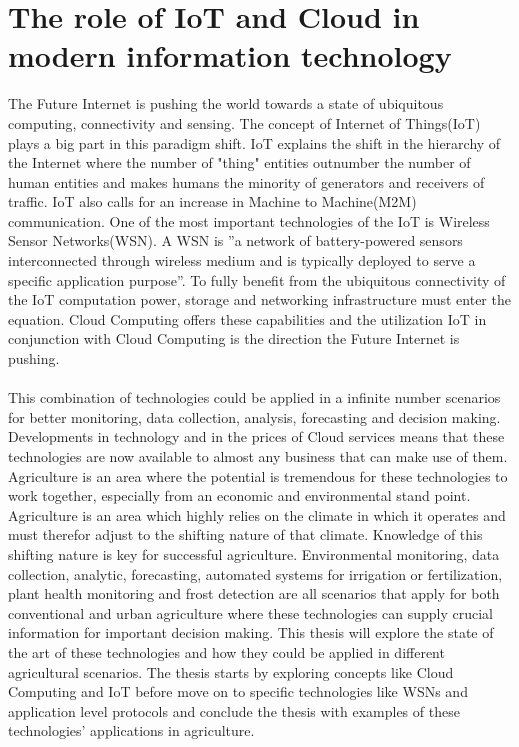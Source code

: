 \documentclass[]{uiophd}
\begin{document}
\section{The role of IoT and Cloud in modern information technology}
The Future Internet is pushing the world towards a state of ubiquitous computing, connectivity and sensing. The concept of Internet of Things(IoT) plays a big part in this paradigm shift. IoT explains the shift in the hierarchy of the Internet where the number of "thing" entities outnumber the number of human entities and makes humans the minority of generators and receivers of traffic. IoT also calls for an increase in Machine to Machine(M2M) communication. One of the most important technologies of the IoT is Wireless Sensor Networks(WSN). A WSN is ''a network of battery-powered sensors interconnected through wireless medium and is typically deployed to serve a specific application purpose''\cite{Ojha2015662}. To fully benefit from the ubiquitous connectivity of the IoT computation power, storage and networking infrastructure must enter the equation. Cloud Computing offers these capabilities and the utilization IoT in conjunction with Cloud Computing is the direction the Future Internet is pushing. 
\\\\
This combination of technologies could be applied in a infinite number scenarios for better monitoring, data collection, analysis, forecasting and decision making. Developments in technology and in the prices of Cloud services means that these technologies are now available to almost any business that can make use of them. Agriculture is an area where the potential is tremendous for these technologies to work together, especially from an economic and environmental stand point. Agriculture is an area which highly relies on the climate in which it operates and must therefor adjust to the shifting nature of that climate. Knowledge of this shifting nature is key for successful agriculture. Environmental monitoring, data collection, analytic, forecasting, automated systems for irrigation or fertilization, plant health monitoring and frost detection are all scenarios that apply for both conventional and urban agriculture where these technologies can supply crucial information for important decision making. This thesis will explore the state of the art of these technologies and how they could be applied in different agricultural scenarios. The thesis starts by exploring concepts like Cloud Computing and IoT before move on to specific technologies like WSNs and application level protocols and conclude the thesis with examples of these technologies' applications in agriculture.
\end{document}
